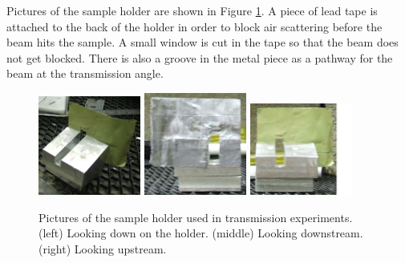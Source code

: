 \documentclass[letterpaper,12pt]{article}
\begin{document}
Pictures of the sample holder are shown in Figure \ref{fig:SampleHolder}. A piece of lead tape is attached to the back of the holder in order to block air scattering before the beam hits the sample. A small window is cut in the tape so that the beam does not get blocked. There is also a groove in the metal piece as a pathway for the beam at the transmission angle.
\begin{figure}[htbp]
	\centering
	\includegraphics[width=0.3\textwidth]{SampleHolder1}
	\includegraphics[width=0.3\textwidth]{SampleHolder2}
	\includegraphics[width=0.3\textwidth]{SampleHolder3}
	\caption[Pictures of the sample holder used in transmission experiments]{Pictures of the sample holder used in transmission experiments. (left) Looking down on the holder. (middle) Looking downstream. (right) Looking upstream.}
	\label{fig:SampleHolder}
\end{figure}
\end{document}
